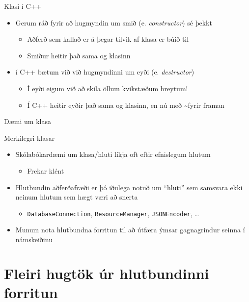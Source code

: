 \documentclass[handout]{beamer}
\begin{document}
\begin{frame}{Klasi í C++}
\begin{itemize}
 \item Gerum ráð fyrir að hugmyndin um smið (e. \emph{constructor}) sé þekkt
 \begin{itemize}
  \item Aðferð sem kallað er á þegar tilvik af klasa er búið til
  \item Smiður heitir það sama og klasinn
 \end{itemize}
 \item í C++ bætum við við hugmyndinni um eyði (e. \emph{destructor}) 
 \begin{itemize}
  \item Í eyði eigum við að skila öllum kvikstæðum breytum!
  \item Í C++ heitir eyðir það sama og klasinn, en nú með \textasciitilde fyrir framan
 \end{itemize}
\end{itemize}
\end{frame}

\begin{frame}{Dæmi um klasa}

\end{frame}

\begin{frame}{Merkilegri klasar}
\begin{itemize}
 \item Skólabókardæmi um klasa/hluti líkja oft eftir efnislegum hlutum
 \begin{itemize}
  \item Frekar klént
 \end{itemize}
 \item Hlutbundin aðferðafræði er þó iðulega notuð um ``hluti'' sem samsvara ekki neinum hlutum sem hægt væri að snerta
 \begin{itemize}
  \item \texttt{DatabaseConnection}, \texttt{ResourceManager}, \texttt{JSONEncoder}, \ldots
 \end{itemize}
 \item Munum nota hlutbundna forritun til að útfæra ýmsar gagnagrindur seinna í námskeiðinu
\end{itemize}
\end{frame}

\section{Fleiri hugtök úr hlutbundinni forritun}
\end{document}
